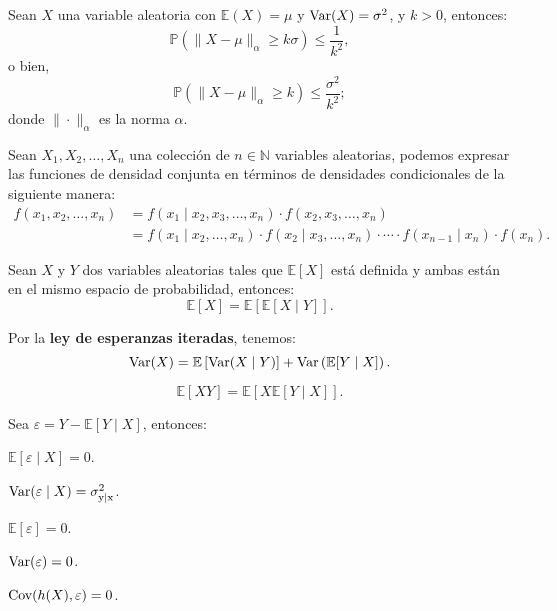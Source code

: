 \documentclass[8pt,a4paper]{extarticle}
\begin{document}
\begin{multicols}{3}
	\begin{boxtheo}
		Sean $X$ una variable aleatoria con $\mathbb{E}(X) = \mu$ y $\text{\normalfont Var}(X) = \sigma^2$, y $k > 0$, entonces:
		\[
			\mathbb{P}\left( \|X - \mu\|_{\alpha} \ge k\sigma \right) \le \frac{1}{k^2}
			,\]
		o bien,
		\[
			\mathbb{P}\left( \|X - \mu\|_{\alpha} \ge k \right) \le \frac{\sigma^2}{k^2}
			;\]
		donde $\| \cdot \|_{\alpha}$ es la norma $\alpha$.
	\end{boxtheo}

	\begin{boxrmk}[]
		Sean $X_1, X_2, \ldots, X_n$ una colección de $n\in\mathbb{N}$ variables aleatorias, podemos expresar las funciones de densidad conjunta en términos de densidades condicionales de la siguiente manera:
		\begin{align*}
			f(x_1, x_2, \ldots, x_n) & = f(x_1  \mid x_2, x_3, \ldots, x_n)\cdot  f(x_2, x_3, \ldots, x_n)                                                         \\
			                         & =  f(x_1  \mid x_2, \ldots, x_n) \cdot f(x_2  \mid x_3, \ldots, x_n) \cdot \cdots \cdot f(x_{n-1}  \mid x_n) \cdot f(x_{n})
			.\end{align*}
	\end{boxrmk}

	\begin{boxtheo}
		Sean $X$ y $Y$ dos variables aleatorias tales que $\mathbb{E}\left[ X \right] $ está definida y ambas están en el mismo espacio de probabilidad, entonces:
		\[
			\mathbb{E}\left[ X \right] = \mathbb{E}\left[ \mathbb{E}\left[ X  \mid Y \right]  \right]
			.\]
	\end{boxtheo}

	\begin{boxprop}[]
		Por la \textbf{ley de esperanzas iteradas}, tenemos:
		\[
			\text{\normalfont Var}(X) = \mathbb{E}\left[ \text{\normalfont Var}(X  \mid Y) \right] + \text{\normalfont Var} \left( \mathbb{E}[Y  \mid X] \right)
			.\]
	\end{boxprop}

	\begin{boxprop}[]
		\[
			\mathbb{E}[XY] = \mathbb{E}\left[ X \mathbb{E}[Y  \mid  X] \right]
			.\]
	\end{boxprop}

	\begin{boxprop}[]
		Sea $\varepsilon = Y - \mathbb{E}[Y \mid X]$, entonces:
		\begin{eqlist}
			\item $\mathbb{E}[\varepsilon  \mid X] = 0$.
			\item $\text{\normalfont Var}(\varepsilon  \mid X) = \sigma^2_{\mathrm{y \mid x}}$.
			\item $\mathbb{E}[\varepsilon] = 0$.
			\item $\text{\normalfont Var}(\varepsilon) = 0$.
			\item $\text{\normalfont Cov}(h(X), \varepsilon) = 0$.
		\end{eqlist}
	\end{boxprop}


\end{multicols}
\end{document}
